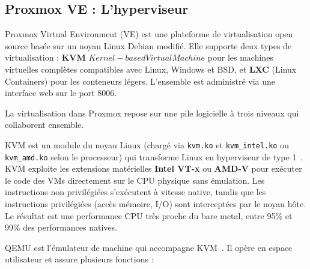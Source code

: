 \subsection{Proxmox VE : L'hyperviseur}


\par Proxmox Virtual Environment (VE) est une plateforme de virtualisation open source basée sur un noyau Linux Debian modifié. Elle supporte deux types de virtualisation : \textbf{KVM} \(Kernel-based Virtual Machine\) pour les machines virtuelles complètes compatibles avec Linux, Windows et BSD, et \textbf{LXC} (Linux Containers) pour les conteneurs légers. L'ensemble est administré via une interface web sur le port 8006.\\


\par La virtualisation dans Proxmox repose sur une pile logicielle à trois niveaux qui collaborent ensemble.\\


\par KVM est un module du noyau Linux (chargé via \texttt{kvm.ko} et \texttt{kvm\_intel.ko} ou \texttt{kvm\_amd.ko} selon le processeur) qui transforme Linux en hyperviseur de type 1~\cite{refKVM}. KVM exploite les extensions matérielles \textbf{Intel VT-x} ou \textbf{AMD-V} pour exécuter le code des VMs directement sur le CPU physique sans émulation. Les instructions non privilégiées s'exécutent à vitesse native, tandis que les instructions privilégiées (accès mémoire, I/O) sont interceptées par le noyau hôte. Le résultat est une performance CPU très proche du bare metal, entre 95\% et 99\% des performances natives.\\


\par QEMU est l'émulateur de machine qui accompagne KVM~\cite{refQEMU}. Il opère en espace utilisateur et assure plusieurs fonctions :\\

